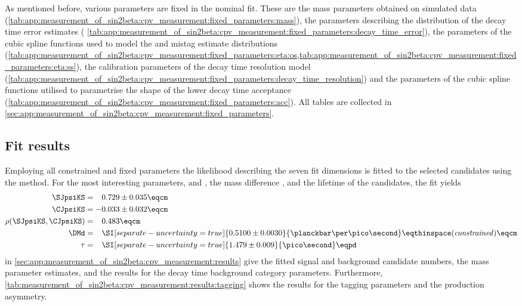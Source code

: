 As mentioned before, various parameters are fixed in the nominal fit. These are
the mass parameters obtained on simulated data
(\cref{tab:app:measurement_of_sin2beta:cpv_measurement:fixed_parameters:mass}), the
parameters describing the distribution of the decay time error estimates (
\cref{tab:app:measurement_of_sin2beta:cpv_measurement:fixed_parameters:decay_time_error}), 
the parameters of the cubic spline functions used to model the \OS and
\SSpi mistag estimate distributions (\cref{tab:app:measurement_of_sin2beta:cpv_measurement:fixed_parameters:eta:os,tab:app:measurement_of_sin2beta:cpv_measurement:fixed_parameters:eta:ss}), 
the calibration parameters of the decay time resolution model (\cref{tab:app:measurement_of_sin2beta:cpv_measurement:fixed_parameters:decay_time_resolution})
and the parameters of the cubic spline functions utilised to parametrise the
shape of the lower decay time acceptance
(\cref{tab:app:measurement_of_sin2beta:cpv_measurement:fixed_parameters:acc}).
All tables are collected in
\cref{sec:app:measurement_of_sin2beta:cpv_measurement:fixed_parameters}.

\subsection{Fit results}
\label{sec:measurement_of_sin2beta:cpv_measurement:results}

Employing all constrained and fixed parameters the likelihood describing the
seven fit dimensions is fitted to the selected \BdToJpsiKS candidates using the
\uEML method. For the most interesting \CP parameters, \SJpsiKS and \CJpsiKS,
the mass difference \DMd, and the lifetime of the \Bd candidates, the fit yields
%
\begin{equation}\label{eq:measurement_of_sin2beta:cpv_measurement:results}
  \begin{split}
    \SJpsiKS                &= \phantom{+}0.729 \pm 0.035 \eqcm \\
    \CJpsiKS                &= -0.033 \pm 0.032 \eqcm \\
    \rho(\SJpsiKS,\CJpsiKS) &= \phantom{+}0.483 \eqcm \\
    \DMd                    &= \phantom{+}\SI[separate-uncertainty=true]{0.5100 \pm 0.0030}{\planckbar\per\pico\second} \eqthinspace (\text{\textit{constrained}})\eqcm \\
    \tau                    &= \phantom{+}\SI[separate-uncertainty=true]{1.479 \pm 0.009}{\pico\second} \eqpd \\
  \end{split}
\end{equation}
%
 in \cref{sec:app:measurement_of_sin2beta:cpv_measurement:results} 
give the fitted signal and background candidate numbers, the mass parameter
estimates, and the results for the decay time background category parameters.
Furthermore, \cref{tab:measurement_of_sin2beta:cpv_measurement:results:tagging}
shows the results for the tagging parameters and the production asymmetry.

